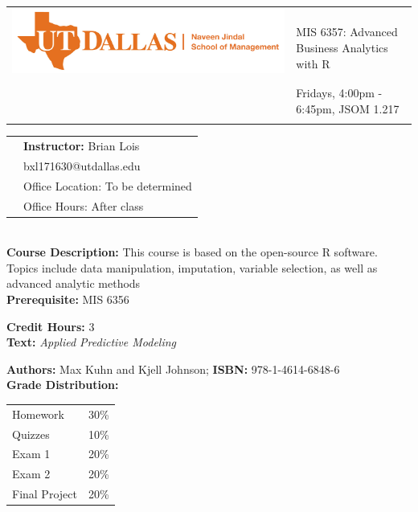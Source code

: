 \documentclass[11pt]{article}
\begin{document}
\begin{tabular}{ l l }
  \multirow{3}{*}{\includegraphics[scale=.3]{UTD_SOM_logo.jpg}} & \LARGE  \\\\
  & \LARGE MIS 6357: Advanced Business Analytics with R \\\\
  & \LARGE Fridays, 4:00pm - 6:45pm, JSOM 1.217 \\\\
\end{tabular}
\vspace{10mm}

\begin{tabular}{ l l }
 
 & \large \textbf{Instructor:} Brian Lois \\
  & \large bxl171630@utdallas.edu \\
  & \large Office Location: To be determined \\
  & \large Office Hours: After class \\
\end{tabular}
\vspace{5mm}

\textbf {\large \\ Course Description:} This course is based on the open-source R software. Topics include data manipulation, imputation, variable selection, as well as advanced analytic methods \\
\textbf {Prerequisite:} MIS 6356

\textbf {Credit Hours:} 3 \\

\textbf {\large Text:} \emph{Applied Predictive Modeling}

\textbf {Authors:} Max Kuhn and Kjell Johnson;  \textbf {ISBN:} 978-1-4614-6848-6 \\


\textbf {\large Grade Distribution:} \\
\hspace*{40mm}
\begin{tabular}{ l l }
Homework & 30\% \\
Quizzes  & 10\% \\
Exam 1 & 20\% \\
Exam 2 & 20\% \\
Final Project  & 20\% \\
\end{tabular} \\\\
\end{document}
